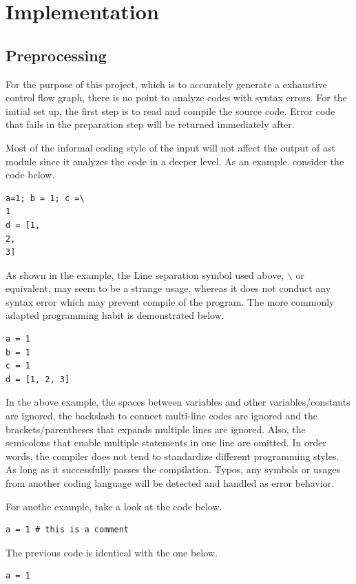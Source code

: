 \documentclass[11pt]{article}
\begin{document}
\section{Implementation}\label{section-implementation}
\subsection{Preprocessing}
For the purpose of this project, which is to accurately generate a exhaustive control flow graph, there is no point to analyze codes with syntax errors. For the initial set up, the first step is to read and compile the source code. Error code that fails in the preparation step will be returned immediately after.

Most of the informal coding style of the input will not affect the output of ast module since it analyzes the code in a deeper level. As an example. consider the code below.
\begin{lstlisting}
a=1; b = 1; c =\
1
d = [1,
2,
3]
\end{lstlisting}

As shown in the example, the Line separation symbol used above, $\backslash$ or equivalent, may seem to be a strange usage, whereas it does not conduct any syntax error which may prevent compile of the program. The more commonly adapted programming habit is demonstrated below.
\begin{lstlisting}
a = 1
b = 1
c = 1
d = [1, 2, 3]
\end{lstlisting}

In the above example, the spaces between variables and other variables/constants are ignored, the backslash to connect multi-line codes are ignored and the brackets/parentheses that expands multiple lines are ignored. Also, the semicolons that enable multiple statements in one line are omitted. In order words, the compiler does not tend to standardize different programming styles. As long as it successfully passes the compilation. Typos, any symbols or usages from another coding language will be detected and handled as error behavior.

For anothe example, take a look at the code below.
\begin{lstlisting}
a = 1 # this is a comment
\end{lstlisting}

The previous code is identical with the one below.
\begin{lstlisting}
a = 1
\end{lstlisting}
\end{document}
